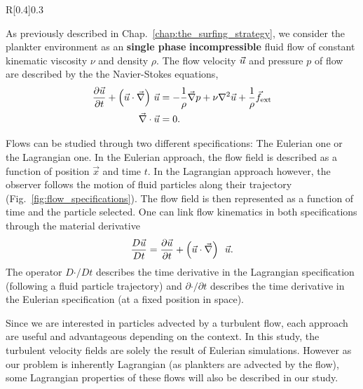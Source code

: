 \begin{wrapfigure}[16]{R}[0.4\width]{0.3\textwidth}
	\centering
	\vspace{-25pt}
	\def\svgwidth{0.25\textwidth}
	
	\captionsetup{width=0.25\textwidth}
  	\caption{
  		Illustration of the differences of Eulerian and Lagrangian specification.
  	}
  	\label{fig:flow_specifications}
\end{wrapfigure}
As previously described in Chap.~\ref{chap:the_surfing_strategy}, we consider the plankter environment as an \textbf{single phase} \textbf{incompressible} fluid flow of constant kinematic viscosity $\nu$ and density $\rho$.
The flow velocity $\vec{u}$ and pressure $p$ of flow are described by the the Navier-Stokes equations,
\begin{subequations}\label{turb:eq:navier_stokes}
	\begin{align}
		\frac{\partial \vec{u}}{\partial t} + \left( \vec{u} \cdot \vec{\nabla} \right) \, \vec{u} & =
		- \frac{1}{\rho} \vec{\nabla} p + \nu \nabla^2 \vec{u} + \frac{1}{\rho} \vec{f}_{\mathrm{ext}}\label{turb:eq:navier_stokes_momentum} \\
		\vec{\nabla} \cdot \vec{u} & = 0.\label{turb:eq:navier_stokes_mass}
	\end{align}
\end{subequations}

Flows can be studied through two different specifications: The Eulerian one or the Lagrangian one.
In the Eulerian approach, the flow field is described as a function of position $\vec{x}$ and time $t$. 
In the Lagrangian approach however, the observer follows the motion of fluid particles along their trajectory (Fig.~\ref{fig:flow_specifications}).
The flow field is then represented as a function of time and the particle selected.
One can link flow kinematics in both specifications through the material derivative
\begin{equation}
	\frac{D \vec{u}}{D t} = \frac{\partial \vec{u}}{\partial t} + \left( \vec{u} \cdot \vec{\nabla} \right)\ \, \vec{u}.
\end{equation}
The operator $D \mathord{\cdot} / D t$ describes the time derivative in the Lagrangian specification (following a fluid particle trajectory) and $\partial \mathord{\cdot} / \partial t$ describes the time derivative in the Eulerian specification (at a fixed position in space).

Since we are interested in particles advected by a turbulent flow, each approach are useful and advantageous depending on the context.
In this study, the turbulent velocity fields are solely the result of Eulerian simulations.
However as our problem is inherently Lagrangian (as plankters are advected by the flow), some Lagrangian properties of these flows will also be described in our study.

